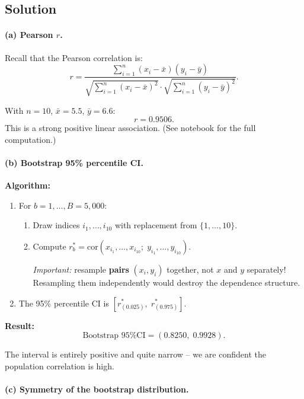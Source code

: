 \documentclass[11pt]{article}
\begin{document}
\subsection*{Solution}

\paragraph{(a) Pearson $r$.}

Recall that the Pearson correlation is:
\[
  r = \frac{\sum_{i=1}^n (x_i - \bar{x})(y_i - \bar{y})}
           {\sqrt{\sum_{i=1}^n (x_i - \bar{x})^2} \cdot \sqrt{\sum_{i=1}^n (y_i - \bar{y})^2}}.
\]

With $n = 10$, $\bar{x} = 5.5$, $\bar{y} = 6.6$:
\[
  \boxed{r = 0.9506}.
\]
This is a strong positive linear association. (See notebook for the full computation.)

\paragraph{(b) Bootstrap 95\% percentile CI.}

\textbf{Algorithm:}
\begin{enumerate}
  \item For $b = 1, \ldots, B = 5{,}000$:
  \begin{enumerate}
    \item Draw indices $i_1, \ldots, i_{10}$ with replacement from $\{1, \ldots, 10\}$.
    \item Compute $r^*_b = \text{cor}(x_{i_1}, \ldots, x_{i_{10}};\; y_{i_1}, \ldots, y_{i_{10}})$.

    \textit{Important:} resample \textbf{pairs} $(x_i, y_i)$ together, not $x$ and $y$ separately! Resampling them independently would destroy the dependence structure.
  \end{enumerate}
  \item The 95\% percentile CI is $[r^*_{(0.025)},\; r^*_{(0.975)}]$.
\end{enumerate}

\textbf{Result:}
\[
  \boxed{\text{Bootstrap 95\% CI} = (0.8250,\; 0.9928)}.
\]

The interval is entirely positive and quite narrow -- we are confident the population correlation is high.

\paragraph{(c) Symmetry of the bootstrap distribution.}
\end{document}
